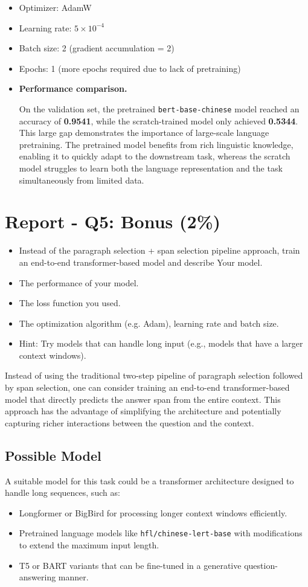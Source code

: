 \documentclass{article}
\begin{document}
\begin{itemize}
    \item Optimizer: AdamW
    \item Learning rate: $5 \times 10^{-4}$
    \item Batch size: 2 (gradient accumulation = 2)
    \item Epochs: 1 (more epochs required due to lack of pretraining)
    \item \textbf{Performance comparison.}
    
    On the validation set, the pretrained \texttt{bert-base-chinese} model reached an accuracy of \textbf{0.9541}, while the scratch-trained model only achieved \textbf{0.5344}. This large gap demonstrates the importance of large-scale language pretraining. The pretrained model benefits from rich linguistic knowledge, enabling it to quickly adapt to the downstream task, whereas the scratch model struggles to learn both the language representation and the task simultaneously from limited data.
\end{itemize}

\section{Report - Q5: Bonus (2\%)}
\begin{itemize}
    \item Instead of the paragraph selection + span selection pipeline approach, train an end-to-end transformer-based model and describe
          Your model.
    \item The performance of your model.
    \item The loss function you used.
    \item The optimization algorithm (e.g. Adam), learning rate and batch size.
    \item Hint: Try models that can handle long input (e.g., models that have a larger context windows).
\end{itemize}

Instead of using the traditional two-step pipeline of paragraph selection followed by span selection, one can consider training an end-to-end transformer-based model that directly predicts the answer span from the entire context. This approach has the advantage of simplifying the architecture and potentially capturing richer interactions between the question and the context.

\subsection{Possible Model}
A suitable model for this task could be a transformer architecture designed to handle long sequences, such as:
\begin{itemize}
    \item Longformer or BigBird for processing longer context windows efficiently.
    \item Pretrained language models like \texttt{hfl/chinese-lert-base} with modifications to extend the maximum input length.
    \item T5 or BART variants that can be fine-tuned in a generative question-answering manner.
\end{itemize}
\end{document}
